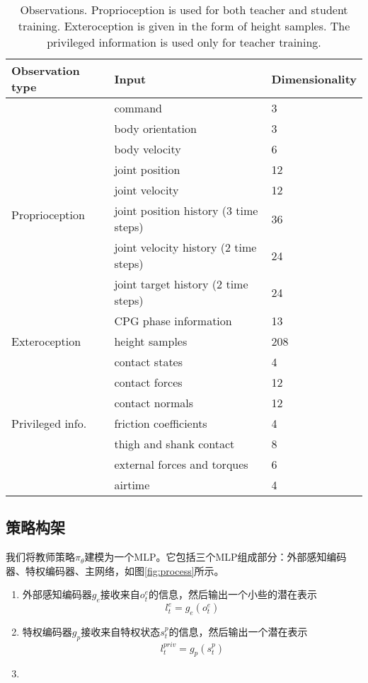   \begin{table}
    \centering
    \caption{Observations. Proprioception is used for both teacher and student training. Exteroception is given in the form of height samples. The privileged information is used only for teacher training.}
    \label{tb:observations}
    \begin{tabular}{l|ll}
      \hline
      Observation type & Input & Dimensionality\\
      \hline
      \multirow{9}{*}{Proprioception} & command & 3\\
      &body orientation & 3\\
      &body velocity & 6 \\
      &joint position & 12 \\
      &joint velocity & 12 \\
      &joint position history (3 time steps) & 36\\
      &joint velocity history (2 time steps) & 24 \\
      &joint target history (2 time steps) & 24 \\
      &CPG phase information & 13 \\
      \hline
      Exteroception & height samples & 208\\
      \hline
      \multirow{8}{*}{Privileged info.} & contact states & 4\\
      &contact forces & 12\\
      &contact normals & 12 \\
      &friction coefficients & 4\\
      &thigh and shank contact & 8 \\
      &external forces and torques & 6\\
      &airtime & 4 \\
      \hline 
    \end{tabular}
  \end{table}
  
  
  \subsection[策略构架]{策略构架}
  
  我们将教师策略$\pi_{\theta}$建模为一个MLP。它包括三个MLP组成部分：外部感知编码器、特权编码器、主网络，如图\ref{fig:process}所示。
  \begin{enumerate}
    \item 外部感知编码器$g_e$接收来自$o_t^e$的信息，然后输出一个小些的潜在表示$$l_t^e=g_e(o_t^e)$$
    \item 特权编码器$g_p$接收来自特权状态$s_t^p$的信息，然后输出一个潜在表示$$l_t^{priv}=g_p(s_t^p)$$
    \item 
  \end{enumerate}
  
